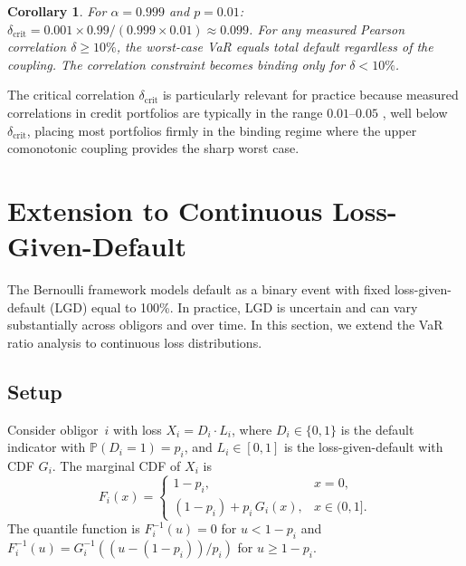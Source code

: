 \documentclass[11pt]{article}
\newtheorem{corollary}[theorem]{Corollary}
\theoremstyle{definition}
\newcommand{\PP}{\mathbb{P}}
\newcommand{\1}{\mathbf{1}}
\begin{document}
\begin{corollary}\label{cor:delta_crit}
For $\alpha = 0.999$ and $p = 0.01$: $\delta_{\mathrm{crit}} = 0.001 \times 0.99/(0.999 \times 0.01) \approx 0.099$. For any measured Pearson correlation $\delta \geq 10\%$, the worst-case VaR equals total default regardless of the coupling. The correlation constraint becomes binding only for $\delta < 10\%$.
\end{corollary}

The critical correlation $\delta_{\mathrm{crit}}$ is particularly relevant for practice because measured correlations in credit portfolios are typically in the range $0.01$--$0.05$ \citep{McNeilEtAl2015}, well below $\delta_{\mathrm{crit}}$, placing most portfolios firmly in the binding regime where the upper comonotonic coupling provides the sharp worst case.

\section{Extension to Continuous Loss-Given-Default}\label{sec:lgd}

The Bernoulli framework models default as a binary event with fixed loss-given-default (LGD) equal to 100\%. In practice, LGD is uncertain and can vary substantially across obligors and over time. In this section, we extend the VaR ratio analysis to continuous loss distributions.

\subsection{Setup}\label{sec:lgd_setup}

Consider obligor~$i$ with loss $X_i = D_i \cdot L_i$, where $D_i \in \{0,1\}$ is the default indicator with $\PP(D_i = 1) = p_i$, and $L_i \in [0,1]$ is the loss-given-default with CDF $G_i$. The marginal CDF of $X_i$ is
\begin{equation}\label{eq:compound_cdf}
  F_i(x) = \begin{cases}
    1 - p_i, & x = 0, \\
    (1 - p_i) + p_i\,G_i(x), & x \in (0, 1].
  \end{cases}
\end{equation}
The quantile function is $F_i^{-1}(u) = 0$ for $u < 1 - p_i$ and $F_i^{-1}(u) = G_i^{-1}((u - (1-p_i))/p_i)$ for $u \geq 1 - p_i$.
\end{document}
